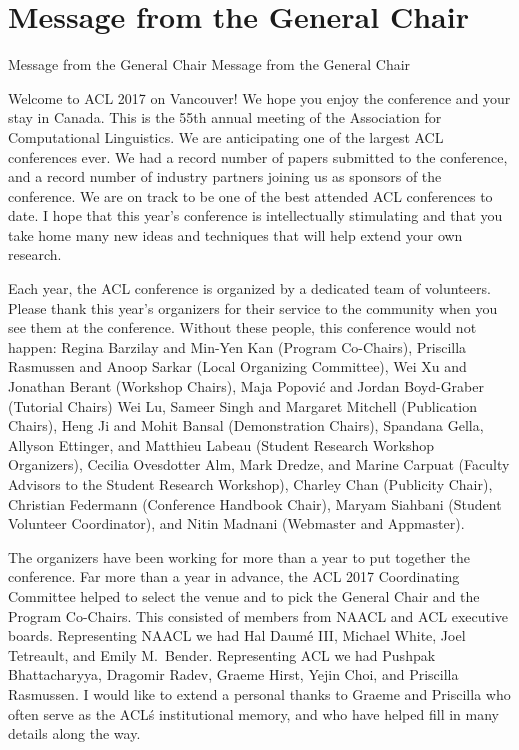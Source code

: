 \vspace{2em}

\section{Message from the General Chair}\vspace{2em}
\setheaders%
    {Message from the General Chair}%
    {Message from the General Chair}
\thispagestyle{emptyheader}

\setlength{\parskip}{1ex}


Welcome to ACL 2017 on Vancouver!  We hope you enjoy the conference and your
stay in Canada.    This is the 55th annual meeting of the Association for Computational Linguistics.  We are anticipating one of the largest ACL conferences ever.  We had a record number of papers submitted to the conference, and a record number of industry partners joining us as sponsors of the conference.   We are on track to be one of the best attended ACL conferences to date.   I hope that this year's conference is intellectually stimulating and that you take home many new ideas and techniques that will help extend your own research.

Each year, the ACL conference is organized by a dedicated team of volunteers.  Please thank this year's organizers for their service to the community when you see them at the conference.  Without these people, this conference would not happen:  Regina Barzilay and Min-Yen Kan (Program Co-Chairs),
Priscilla Rasmussen and Anoop Sarkar (Local Organizing Committee),
Wei Xu and  Jonathan Berant (Workshop Chairs),
Maja Popovi\'c and Jordan Boyd-Graber (Tutorial Chairs)
Wei Lu, Sameer Singh and Margaret Mitchell (Publication Chairs),
Heng Ji and Mohit Bansal (Demonstration Chairs),
Spandana Gella, Allyson Ettinger, and Matthieu Labeau (Student Research Workshop Organizers),
Cecilia Ovesdotter Alm, Mark Dredze, and Marine Carpuat (Faculty Advisors to the Student Research Workshop),
Charley Chan  (Publicity Chair),
Christian Federmann (Conference Handbook Chair), 
Maryam Siahbani (Student Volunteer Coordinator), 
and 
Nitin Madnani (Webmaster and Appmaster).

The organizers have been working for more than a year to put together the conference.  Far more than a year in advance, the  ACL 2017 Coordinating Committee helped to select the venue and to pick the General Chair and the Program Co-Chairs.  This consisted of members from  NAACL and ACL executive boards. Representing NAACL we had Hal Daum\'e III,  Michael White, Joel Tetreault,  and Emily M.\ Bender.  Representing ACL we had  Pushpak Bhattacharyya, Dragomir Radev,   Graeme Hirst, Yejin Choi, and Priscilla Rasmussen.  I would like to extend a personal thanks to Graeme and Priscilla who often serve as the ACL\'s institutional memory, and who have helped fill in many details along the way.


